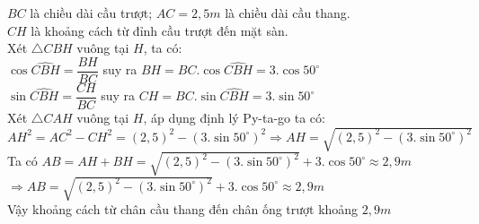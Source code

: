 \begin{ex}
{\begin{center}
\begin{tikzpicture}[scale=1.5, line cap=round, line join=round, >=stealth, font=\small]
	\end{tikzpicture}
	\end{center}
	$BC$ là chiều dài cầu trượt; $AC=2,5m$ là chiều dài cầu thang.\\
	$CH$ là khoảng cách từ đỉnh cầu trượt đến mặt sàn.\\
	Xét $\triangle CBH$ vuông tại $H$, ta có:\\
	$\cos \widehat{CBH}=\dfrac{BH}{BC}$ suy ra $BH=BC.\cos \widehat{CBH}=3.\cos{50^\circ}$\\
	$\sin \widehat{CBH}=\dfrac{CH}{BC}$ suy ra $CH=BC.\sin \widehat{CBH}=3.\sin{50^\circ}$\\
	Xét $\triangle CAH$ vuông tại $H$, áp dụng định lý Py-ta-go ta có:\\
	$AH^2=AC^2-CH^2=\left(2,5\right)^2-\left(3.\sin{50^\circ}\right)^2\Rightarrow AH=\sqrt{\left(2,5\right)^2-\left(3.\sin{50^\circ}\right)^2}$\\
	Ta có $AB=AH+BH=\sqrt{\left(2,5\right)^2-\left(3.\sin{50^\circ}\right)^2}+3.\cos{50^\circ}\approx 2,9m$\\
	$\Rightarrow AB=\sqrt{\left(2,5\right)^2-\left(3.\sin{50^\circ}\right)^2}+3.\cos{50^\circ}\approx 2,9m$\\
	Vậy khoảng cách từ chân cầu thang đến chân ống trượt khoảng $2,9m$\\
	}
\end{ex}
